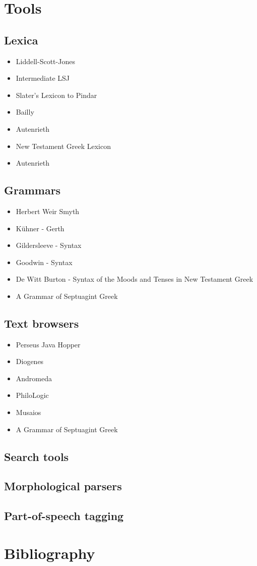 \section{Tools}
\label{sect:tools}
\subsection{Lexica}
\label{subsect:lexica}
\begin{itemize}
\item Liddell-Scott-Jones
\item Intermediate LSJ
\item Slater's Lexicon to Pindar
\item Bailly
\item Autenrieth
\item New Testament Greek Lexicon
\item Autenrieth
\end{itemize}
\subsection{Grammars}
\label{subsect:grammars}
\begin{itemize}
\item Herbert Weir Smyth
\item K\"{u}hner - Gerth
\item Gildersleeve - Syntax
\item Goodwin - Syntax
\item De Witt Burton - Syntax of the Moods and Tenses in New Testament Greek
\item A Grammar of Septuagint Greek
\end{itemize}
\subsection{Text browsers}
\label{subsect:textbrowsers}
\begin{itemize}
\item Perseus Java Hopper
\item Diogenes
\item Andromeda
\item PhiloLogic
\item Musaios
\item A Grammar of Septuagint Greek
\end{itemize}
\subsection{Search tools}
\label{subsect:searchtools}
\subsection{Morphological parsers}
\label{subsect:morphparsers}
\subsection{Part-of-speech tagging}
\label{subsect:postagging}
\section{Bibliography}
\label{sect:digitalbibliography}
